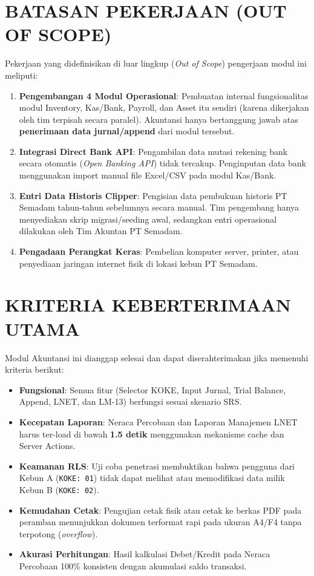 \documentclass[11pt,a4paper]{article}
\begin{document}
\section{BATASAN PEKERJAAN (OUT OF SCOPE)}
Pekerjaan yang didefinisikan di luar lingkup (\textit{Out of Scope}) pengerjaan modul ini meliputi:
\begin{enumerate}
    \item \textbf{Pengembangan 4 Modul Operasional}: Pembuatan internal fungsionalitas modul Inventory, Kas/Bank, Payroll, dan Asset itu sendiri (karena dikerjakan oleh tim terpisah secara paralel). Akuntansi hanya bertanggung jawab atas \textbf{penerimaan data jurnal/append} dari modul tersebut.
    \item \textbf{Integrasi Direct Bank API}: Pengambilan data mutasi rekening bank secara otomatis (\textit{Open Banking API}) tidak tercakup. Penginputan data bank menggunakan import manual file Excel/CSV pada modul Kas/Bank.
    \item \textbf{Entri Data Historis Clipper}: Pengisian data pembukuan historis PT Semadam tahun-tahun sebelumnya secara manual. Tim pengembang hanya menyediakan skrip migrasi/seeding awal, sedangkan entri operasional dilakukan oleh Tim Akuntan PT Semadam.
    \item \textbf{Pengadaan Perangkat Keras}: Pembelian komputer server, printer, atau penyediaan jaringan internet fisik di lokasi kebun PT Semadam.
\end{enumerate}

\newpage

\section{KRITERIA KEBERTERIMAAN UTAMA}
Modul Akuntansi ini dianggap selesai dan dapat diserahterimakan jika memenuhi kriteria berikut:
\begin{itemize}
    \item \textbf{Fungsional}: Semua fitur (Selector KOKE, Input Jurnal, Trial Balance, Append, LNET, dan LM-13) berfungsi sesuai skenario SRS.
    \item \textbf{Kecepatan Laporan}: Neraca Percobaan dan Laporan Manajemen LNET harus ter-load di bawah \textbf{1.5 detik} menggunakan mekanisme cache dan Server Actions.
    \item \textbf{Keamanan RLS}: Uji coba penetrasi membuktikan bahwa pengguna dari Kebun A (\texttt{KOKE: 01}) tidak dapat melihat atau memodifikasi data milik Kebun B (\texttt{KOKE: 02}).
    \item \textbf{Kemudahan Cetak}: Pengujian cetak fisik atau cetak ke berkas PDF pada peramban menunjukkan dokumen terformat rapi pada ukuran A4/F4 tanpa terpotong (\textit{overflow}).
    \item \textbf{Akurasi Perhitungan}: Hasil kalkulasi Debet/Kredit pada Neraca Percobaan 100\% konsisten dengan akumulasi saldo transaksi.
\end{itemize}
\end{document}
